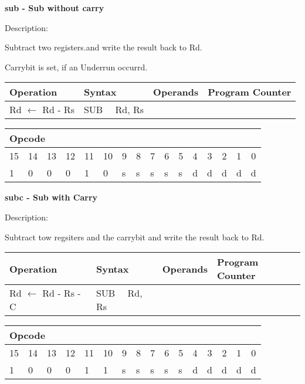 \documentclass{article}
\begin{document}
\bigskip

\textbf{sub - Sub without carry}

Description:

Subtract two registers.and write the result back to Rd.

Carrybit is set, if an Underrun occurrd.

\begin{tabular}{|l|l|l|l|}
\hline
Operation & Syntax & Operands & Program Counter \\ \hline
Rd $\leftarrow $ Rd - Rs & SUB \ \ Rd, Rs &  &  \\ \hline
\end{tabular}

\begin{tabular}{|c|c|c|c|c|c|c|c|c|c|c|c|c|c|c|c|}
\hline
\multicolumn{6}{|l|}{Opcode} & \multicolumn{5}{|l|}{} & \multicolumn{5}{|l|}{
} \\ \hline
15 & 14 & 13 & 12 & 11 & 10 & 9 & 8 & 7 & 6 & 5 & 4 & 3 & 2 & 1 & 0 \\ \hline
\multicolumn{1}{|l|}{1} & \multicolumn{1}{|l|}{0} & \multicolumn{1}{|l|}{0}
& \multicolumn{1}{|l|}{0} & \multicolumn{1}{|l|}{1} & \multicolumn{1}{|l|}{0}
& \multicolumn{1}{|l|}{s} & \multicolumn{1}{|l|}{s} & \multicolumn{1}{|l|}{s}
& \multicolumn{1}{|l|}{s} & \multicolumn{1}{|l|}{s} & \multicolumn{1}{|l|}{d}
& \multicolumn{1}{|l|}{d} & \multicolumn{1}{|l|}{d} & \multicolumn{1}{|l|}{d}
& \multicolumn{1}{|l|}{d} \\ \hline
\end{tabular}

\bigskip

\textbf{subc - Sub with Carry}

Description:

Subtract tow regsiters and the carrybit and write the result back to Rd.

\begin{tabular}{|l|l|l|l|}
\hline
Operation & Syntax & Operands & Program Counter \\ \hline
Rd $\leftarrow $ Rd - Rs - C & SUB \ \ Rd, Rs &  &  \\ \hline
\end{tabular}

\begin{tabular}{|c|c|c|c|c|c|c|c|c|c|c|c|c|c|c|c|}
\hline
\multicolumn{6}{|l|}{Opcode} & \multicolumn{5}{|l|}{} & \multicolumn{5}{|l|}{
} \\ \hline
15 & 14 & 13 & 12 & 11 & 10 & 9 & 8 & 7 & 6 & 5 & 4 & 3 & 2 & 1 & 0 \\ \hline
\multicolumn{1}{|l|}{1} & \multicolumn{1}{|l|}{0} & \multicolumn{1}{|l|}{0}
& \multicolumn{1}{|l|}{0} & \multicolumn{1}{|l|}{1} & \multicolumn{1}{|l|}{1}
& \multicolumn{1}{|l|}{s} & \multicolumn{1}{|l|}{s} & \multicolumn{1}{|l|}{s}
& \multicolumn{1}{|l|}{s} & \multicolumn{1}{|l|}{s} & \multicolumn{1}{|l|}{d}
& \multicolumn{1}{|l|}{d} & \multicolumn{1}{|l|}{d} & \multicolumn{1}{|l|}{d}
& \multicolumn{1}{|l|}{d} \\ \hline
\end{tabular}
\end{document}
